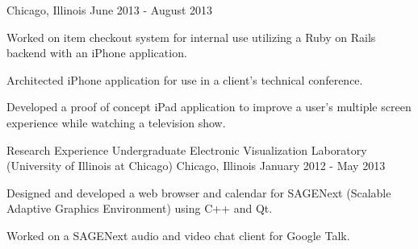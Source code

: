 \begin{cventries}
    {Chicago, Illinois}
    {June 2013 - August 2013}
    {
      \begin{cvitems}
        \item {Worked on item checkout system for internal use utilizing a Ruby on Rails backend with an iPhone application.}
        \item {Architected iPhone application for use in a client's technical conference.}
        \item {Developed a proof of concept iPad application to improve a user’s multiple screen experience while watching a television show.}
      \end{cvitems}
    }
  \cventry
    {Research Experience Undergraduate}
    {Electronic Visualization Laboratory (University of Illinois at Chicago)}
    {Chicago, Illinois}
    {January 2012 - May 2013}
    {
      \begin{cvitems}
        \item {Designed and developed a web browser and calendar for SAGENext (Scalable Adaptive Graphics Environment) using C++ and Qt.}
        \item {Worked on a SAGENext audio and video chat client for Google Talk.}
      \end{cvitems}
    }
\end{cventries}
